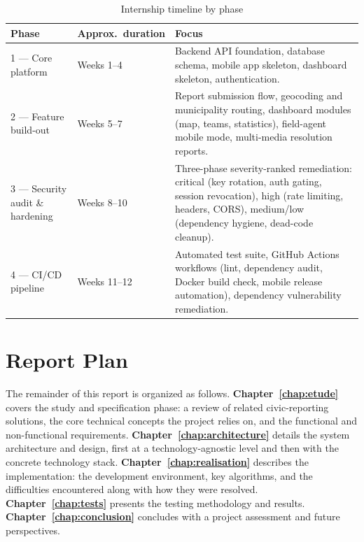\begin{table}[h!]
\centering
\begin{tabularx}{\textwidth}{llX}
\toprule
\textbf{Phase} & \textbf{Approx.\ duration} & \textbf{Focus} \\
\midrule
1 --- Core platform      & Weeks 1--4   & Backend API foundation, database schema, mobile app skeleton, dashboard skeleton, authentication. \\
2 --- Feature build-out  & Weeks 5--7   & Report submission flow, geocoding and municipality routing, dashboard modules (map, teams, statistics), field-agent mobile mode, multi-media resolution reports. \\
3 --- Security audit \& hardening & Weeks 8--10 & Three-phase severity-ranked remediation: critical (key rotation, auth gating, session revocation), high (rate limiting, headers, CORS), medium/low (dependency hygiene, dead-code cleanup). \\
4 --- CI/CD pipeline     & Weeks 11--12 & Automated test suite, GitHub Actions workflows (lint, dependency audit, Docker build check, mobile release automation), dependency vulnerability remediation. \\
\bottomrule
\end{tabularx}
\caption{Internship timeline by phase}
\label{tab:planning}
\end{table}

\section{Report Plan}

The remainder of this report is organized as follows. \textbf{Chapter~\ref{chap:etude}} covers the study and specification phase: a review of related civic-reporting solutions, the core technical concepts the project relies on, and the functional and non-functional requirements. \textbf{Chapter~\ref{chap:architecture}} details the system architecture and design, first at a technology-agnostic level and then with the concrete technology stack. \textbf{Chapter~\ref{chap:realisation}} describes the implementation: the development environment, key algorithms, and the difficulties encountered along with how they were resolved. \textbf{Chapter~\ref{chap:tests}} presents the testing methodology and results. \textbf{Chapter~\ref{chap:conclusion}} concludes with a project assessment and future perspectives.
